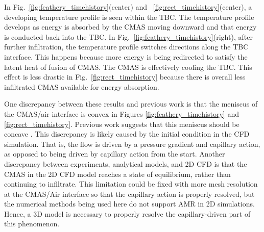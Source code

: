 \documentclass{UCF_ETD}
\begin{document}
In Fig.~\ref{fig:feathery_timehistory}(center) and ~\ref{fig:rect_timehistory}(center), a developing temperature profile is seen within the TBC. The temperature profile develops as energy is absorbed by the CMAS moving downward and that energy is conducted back into the TBC. 
In Fig.~\ref{fig:feathery_timehistory}(right), after further infiltration, the temperature profile switches directions along the TBC interface.
This happens because more energy is being redirected to satisfy the latent heat of fusion of CMAS. The CMAS is effectively cooling the TBC.
This effect is less drastic in Fig.~\ref{fig:rect_timehistory} because there is overall less infiltrated CMAS available for energy absorption.

One discrepancy between these results and previous work is that the meniscus of the CMAS/air interface is convex in Figures \ref{fig:feathery_timehistory} and \ref{fig:rect_timehistory}. Previous work suggests that this meniscus should be concave \cite{Naraparaju2019}. This discrepancy is likely caused by the initial condition in the CFD simulation. That is, the flow is driven by a pressure gradient and capillary action, as opposed to being driven by capillary action from the start. Another discrepancy between experiments, analytical models, and 2D CFD is that the CMAS in the 2D CFD model reaches a state of equilibrium, rather than continuing to infiltrate. This limitation could be fixed with more mesh resolution at the CMAS/Air interface so that the capillary action is properly resolved, but the numerical methods being used here do not support AMR in 2D simulations. Hence, a 3D model is necessary to properly resolve the capillary-driven part of this phenomenon. 

\end{document}
